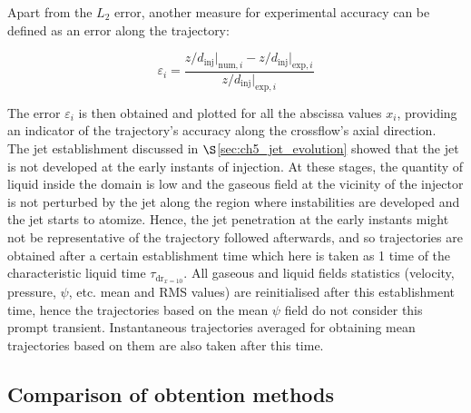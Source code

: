 Apart from the $L_2$ error, another measure for experimental accuracy can be defined as an error along the trajectory:



\begin{equation}
\label{eq:error_along_trajectory}
\varepsilon_i  =  \frac{ z/d_\mathrm{inj} \Bigr|_{\mathrm{num},i} - z/d_\mathrm{inj} \Bigr|_{\mathrm{exp},i} }{ z/d_\mathrm{inj} \Bigr|_{\mathrm{exp},i} }
\end{equation}

The error $\varepsilon_i$ is then obtained and plotted for all the abscissa values $x_i$, providing an indicator of the trajectory’s accuracy along the crossflow’s axial direction. \\


The jet establishment discussed in $\S$\ref{sec:ch5_jet_evolution} showed that the jet is not developed at the early instants of injection. At these stages, the quantity of liquid inside the domain is low and the gaseous field at the vicinity of the injector is not perturbed by the jet along the region where instabilities are developed and the jet starts to atomize. Hence, the jet penetration at the early instants might not be representative of the trajectory followed afterwards, and so trajectories are obtained after a certain establishment time which here is taken as 1 time of the characteristic liquid time $\tau_{\mathrm{dr}_{x=10}}$. All gaseous and liquid fields statistics (velocity, pressure, $\psi$, etc. mean and RMS values) are reinitialised after this establishment time, hence the trajectories based on the mean $\psi$ field do not consider this prompt transient. Instantaneous trajectories averaged for obtaining mean trajectories based on them are also taken after this time.


\subsection{Comparison of obtention methods}

